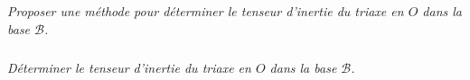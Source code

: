 \documentclass[10pt,fleqn]{article} %
\begin{document}
\begin{multicols}{2}
\subparagraph{}
\textit{Proposer une méthode pour déterminer le tenseur d'inertie du triaxe en $O$ dans la base $\mathcal{B}$.}

\subparagraph{}
\textit{Déterminer le tenseur d'inertie du triaxe en $O$ dans la base $\mathcal{B}$.}


\ifprof

\begin{corrige}  ~\\
%
%
%
%
%
%
%
%
%
% 
%
 

\end{corrige}
\end{multicols}
\end{document}
